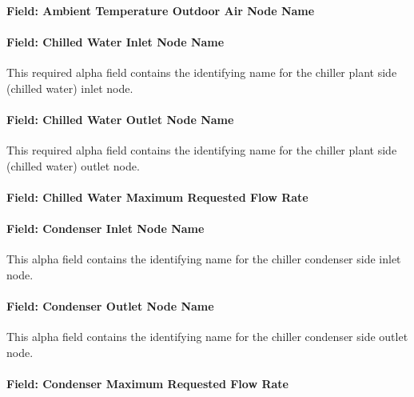 \paragraph{Field: Ambient Temperature Outdoor Air Node Name}\label{field-chiller205-ambient-temperature-outdoor-air-node-name}

\paragraph{Field: Chilled Water Inlet Node Name}\label{field-chiller205-chilled-water-inlet-node-name}

This required alpha field contains the identifying name for the chiller plant side (chilled water) inlet node.

\paragraph{Field: Chilled Water Outlet Node Name}\label{field-chiller205-chilled-water-outlet-node-name}

This required alpha field contains the identifying name for the chiller plant side (chilled water) outlet node.

\paragraph{Field: Chilled Water Maximum Requested Flow Rate}\label{field-chiller205-chilled-water-maximum-requested-flow-rate}

\paragraph{Field: Condenser Inlet Node Name}\label{field-chiller205-condenser-inlet-node-name}

This alpha field contains the identifying name for the chiller condenser side inlet node.

\paragraph{Field: Condenser Outlet Node Name}\label{field-chiller205-condenser-outlet-node-name}

This alpha field contains the identifying name for the chiller condenser side outlet node.

\paragraph{Field: Condenser Maximum Requested Flow Rate}\label{field-chiller205-condenser-maximum-requested-flow-rate}

